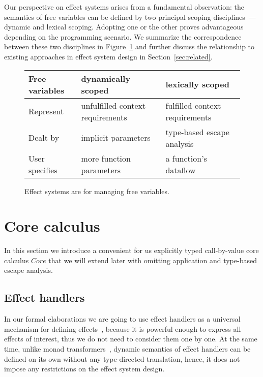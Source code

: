\documentclass[acmsmall]{acmart}
\begin{document}
Our perspective on effect systems arises from a fundamental observation: the semantics of free variables can be defined by two principal scoping disciplines~--- dynamic and lexical scoping.
Adopting one or the other proves advantageous depending on the programming scenario.
We summarize the correspondence between these two disciplines in Figure~\ref{fig:free-vars} and further discuss the relationship to existing approaches in effect system design in Section~\ref{sec:related}.

\begin{figure}
    \centering
    \begin{tabular}{|l|l|l|}
        \hline
        Free variables & dynamically scoped & lexically scoped \\
        \hline
        Represent & unfulfilled context requirements & fulfilled context requirements \\
        Dealt by & implicit parameters & type-based escape analysis \\
        User specifies & more function parameters & a function’s dataflow \\ %
        \hline
    \end{tabular}
    \caption{Effect systems are for managing free variables.}
    \label{fig:free-vars}
\end{figure}


\section{Core calculus} \label{sec:core} %

In this section we introduce a convenient for us explicitly typed call-by-value core calculus $Core$ that we will extend later with omitting application and type-based escape analysis.

\subsection{Effect handlers} \label{subsec:handlers}

In our formal elaborations we are going to use effect handlers as a universal mechanism for defining effects~\cite{plotkin2003algebraic, plotkin2013handling}, because it is powerful enough to express all effects of interest, thus we do not need to consider them one by one.
At the same time, unlike monad transformers~\cite{liang1995monad, schrijvers2019monad}, dynamic semantics of effect handlers can be defined on its own without any type-directed translation, hence, it does not impose any restrictions on the effect system design.
\end{document}
